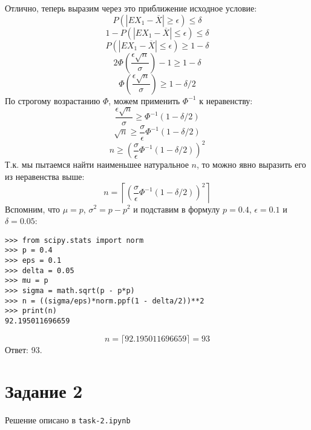 \documentclass[12pt,a4paper]{article}
\begin{document}
Отлично, теперь выразим через это приближение исходное условие:
$$P(|EX_{1}-\overline{X}| \geq \epsilon) \leq \delta$$
$$1 - P(|EX_{1}-\overline{X}| \leq \epsilon) \leq \delta$$
$$P(|EX_{1}-\overline{X}| \leq \epsilon) \geq 1 - \delta$$
$$2\Phi\left(\frac{\epsilon \sqrt{n}}{\sigma}\right) - 1 \geq 1 - \delta$$
$$\Phi\left(\frac{\epsilon \sqrt{n}}{\sigma}\right) \geq 1 - \delta/2$$
По строгому возрастанию  $\Phi$, можем применить $\Phi^{-1}$ к неравенству:
$$\frac{\epsilon \sqrt{n}}{\sigma} \geq \Phi^{-1}\left(1 - \delta/2\right)$$
$$\sqrt{n} \geq \frac{\sigma}{\epsilon} \Phi^{-1}\left(1 - \delta/2\right)$$
$$n \geq \left(\frac{\sigma}{\epsilon} \Phi^{-1}\left(1 - \delta/2\right)\right)^2$$
Т.к. мы пытаемся найти наименьшее натуральное $n$, то можно явно выразить его из
неравенства выше:
$$n = \left\lceil\left(\frac{\sigma}{\epsilon} \Phi^{-1}\left(1 -
    \delta/2\right)\right)^2\right\rceil$$
Вспомним, что $\mu=p$, $\sigma^2=p-p^2$ и подставим в формулу $p=0.4$,
$\epsilon=0.1$ и $\delta=0.05$:
\begin{verbatim}
>>> from scipy.stats import norm
>>> p = 0.4
>>> eps = 0.1
>>> delta = 0.05
>>> mu = p
>>> sigma = math.sqrt(p - p*p)
>>> n = ((sigma/eps)*norm.ppf(1 - delta/2))**2
>>> print(n)
92.195011696659
\end{verbatim}

$$n=\lceil 92.195011696659 \rceil=93$$
Ответ: 93.

\section*{Задание 2}
Решение описано в \texttt{task-2.ipynb}
\end{document}
